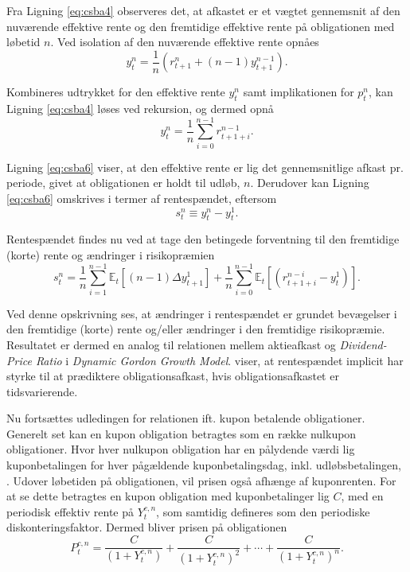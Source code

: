\documentclass[
  a4paper,
  oneside]{memoir}
\begin{document}
Fra Ligning \eqref{eq:csba4} observeres det, at afkastet er et vægtet gennemsnit af den nuværende effektive rente og den fremtidige effektive rente på obligationen med løbetid \(n\). Ved isolation af den nuværende effektive rente opnåes
\begin{equation}
y_t^n = \frac{1}{n} \left(r_{t+1}^n + (n-1) y_{t+1}^{n-1}\right). \label{eq:csba5}
\end{equation}

Kombineres udtrykket for den effektive rente \(y_t^n\) samt implikationen for \(p_t^n\), kan Ligning \eqref{eq:csba4} løses ved rekursion, og dermed opnå
\begin{equation}
y_t^n = \frac{1}{n} \sum_{i=0}^{n-1} r_{t+1+i}^{n-1}. \label{eq:csba6}
\end{equation}

Ligning \eqref{eq:csba6} viser, at den effektive rente er lig det gennemsnitlige afkast pr. periode, givet at obligationen er holdt til udløb, \(n\). Derudover kan Ligning \eqref{eq:csba6} omskrives i termer af rentespændet, eftersom
\begin{equation}
s_t^n\equiv y_t^n - y_t^1. \label{eq:csba7}
\end{equation}

Rentespændet findes nu ved at tage den betingede forventning til den fremtidige (korte) rente og ændringer i risikopræmien
\begin{equation}
s_t^n=\frac{1}{n} \sum_{i=1}^{n-1} \mathbb{E}_t\left[(n-1)\Delta y_{t+1}^1\right] + \frac{1}{n}\sum_{i=0}^{n-1}\mathbb{E}_t\left[(r_{t+1+i}^{n-i}-y_t^1)\right]. \label{eq:csba8}
\end{equation}

Ved denne opskrivning ses, at ændringer i rentespændet er grundet bevægelser i den fremtidige (korte) rente og/eller ændringer i den fremtidige risikopræmie. Resultatet er dermed en analog til relationen mellem aktieafkast og \emph{Dividend-Price Ratio} i \emph{Dynamic Gordon Growth Model}. \citep{Fama1987} viser, at rentespændet implicit har styrke til at prædiktere obligationsafkast, hvis obligationsafkastet er tidsvarierende.

Nu fortsættes udledingen for relationen ift. kupon betalende obligationer. Generelt set kan en kupon obligation betragtes som en række nulkupon obligationer. Hvor hver nulkupon obligation har en pålydende værdi lig kuponbetalingen for hver pågældende kuponbetalingsdag, inkl. udløbsbetalingen, \citep{Campbell1997}. Udover løbetiden på obligationen, vil prisen også afhænge af kuponrenten. For at se dette betragtes en kupon obligation med kuponbetalinger lig \(C\), med en periodisk effektiv rente på \(Y_t^{c,n}\), som samtidig defineres som den periodiske diskonteringsfaktor. Dermed bliver prisen på obligationen
\begin{equation}
P_t^{c,n}=\frac{C}{(1+Y_t^{c,n})}+\frac{C}{(1+Y_t^{c,n})^2}+\cdots+\frac{C}{(1+Y_t^{c,n})^n}.  \label{eq:csba9}
\end{equation}
\end{document}

